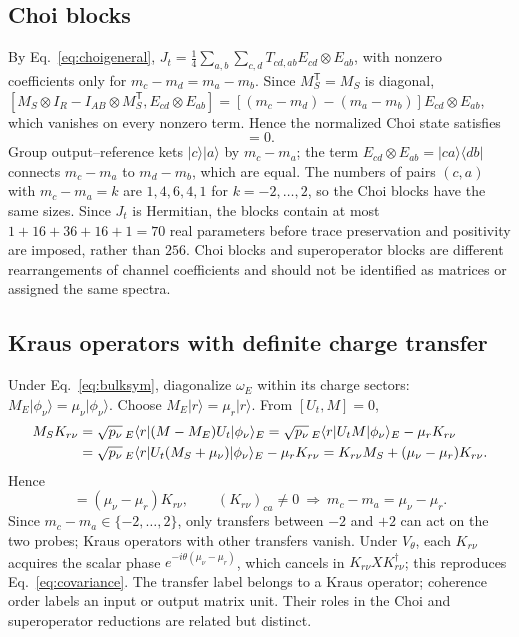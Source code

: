 \documentclass[11pt,a4paper]{article}
\newcommand{\ket}[1]{\lvert #1\rangle}
\newcommand{\bra}[1]{\langle #1\rvert}
\begin{document}
\subsection{Choi blocks}

By Eq.~\eqref{eq:choigeneral},
$J_t=\frac14\sum_{a,b}\sum_{c,d}T_{cd,ab}E_{cd}\otimes E_{ab}$, with
nonzero coefficients only for $m_c-m_d=m_a-m_b$. Since $M_S^{\mathsf T}=M_S$
is diagonal, $[M_S\otimes I_R-I_{AB}\otimes M_S^{\mathsf T},E_{cd}\otimes E_{ab}]
=[(m_c-m_d)-(m_a-m_b)]E_{cd}\otimes E_{ab}$, which vanishes on every
nonzero term. Hence the normalized Choi state satisfies
\begin{equation}
 [J_t,M_S\otimes I_R-I_{AB}\otimes M_S^{\mathsf T}]=0.
\end{equation}
Group output--reference kets $\ket c\ket a$ by $m_c-m_a$; the term
$E_{cd}\otimes E_{ab}=\ket{ca}\bra{db}$ connects $m_c-m_a$ to $m_d-m_b$,
which are equal. The numbers of pairs $(c,a)$ with $m_c-m_a=k$ are
$1,4,6,4,1$ for $k=-2,\ldots,2$, so the Choi blocks have the same sizes.
Since $J_t$ is Hermitian, the blocks contain at most
$1+16+36+16+1=70$ real parameters before trace preservation and positivity
are imposed, rather than $256$. Choi blocks and superoperator blocks are
different rearrangements of channel coefficients and should not be
identified as matrices or assigned the same spectra.

\subsection{Kraus operators with definite charge transfer}

Under Eq.~\eqref{eq:bulksym}, diagonalize $\omega_E$ within its charge
sectors: $M_E\ket{\phi_\nu}=\mu_\nu\ket{\phi_\nu}$. Choose
$M_E\ket r=\mu_r\ket r$. From $[U_t,M]=0$,
\begin{align}
 M_SK_{r\nu}&=\sqrt{p_\nu}\,{}_E\bra r(M-M_E)U_t\ket{\phi_\nu}_E
 =\sqrt{p_\nu}\,{}_E\bra rU_tM\ket{\phi_\nu}_E-\mu_rK_{r\nu}\notag\\
 &=\sqrt{p_\nu}\,{}_E\bra rU_t(M_S+\mu_\nu)\ket{\phi_\nu}_E-\mu_rK_{r\nu}
 =K_{r\nu}M_S+(\mu_\nu-\mu_r)K_{r\nu}.
\end{align}
Hence
\begin{equation}
 [M_S,K_{r\nu}]=(\mu_\nu-\mu_r)K_{r\nu},\qquad
 (K_{r\nu})_{ca}\ne0\ \Longrightarrow\
 m_c-m_a=\mu_\nu-\mu_r .
\end{equation}
Since $m_c-m_a\in\{-2,\ldots,2\}$, only transfers between $-2$ and $+2$
can act on the two probes; Kraus operators with other transfers vanish.
Under $V_\theta$, each $K_{r\nu}$ acquires the scalar phase
$e^{-i\theta(\mu_\nu-\mu_r)}$, which cancels in $K_{r\nu}XK_{r\nu}^\dagger$;
this reproduces Eq.~\eqref{eq:covariance}. The transfer label belongs to
a Kraus operator; coherence order labels an input or output matrix unit.
Their roles in the Choi and superoperator reductions are related but
distinct.
\end{document}

